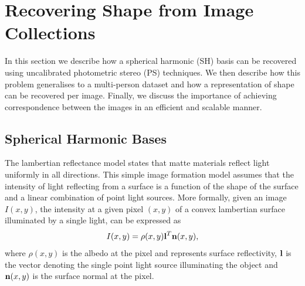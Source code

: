 \section{Recovering Shape from Image Collections}\label{sec:imag_coll_problem}
In this section we describe how a spherical harmonic (SH) basis can be recovered
using uncalibrated photometric stereo (PS) techniques. We then describe how this
problem generalises to a multi-person dataset and how a representation of shape
can be recovered per image. Finally, we discuss the importance of achieving
correspondence between the images in an efficient and scalable manner.
\subsection{Spherical Harmonic Bases}\label{subsec:imag_coll_spherical_harmonic}
The lambertian reflectance model states that matte materials reflect light
uniformly in all directions. This simple image formation model assumes that the
intensity of light reflecting from a surface is a function of the shape of the
surface and a linear combination of point light sources. More formally, given an
image $I(x, y)$, the intensity at a given pixel $(x, y)$ of a convex lambertian
surface illuminated by a single light, can be expressed as
\begin{equation}\label{eq:lambert_law}
    I(x, y) = \rho(x, y) \boldsymbol{\mathbf{l}}^T \boldsymbol{\mathbf{n}}(x, y),
\end{equation}
where $\rho(x, y)$ is the albedo at the pixel and represents surface
reflectivity, $\boldsymbol{\mathbf{l}}$ is the vector denoting the single point light source
illuminating the object and $\boldsymbol{\mathbf{n}}(x, y)$ is the surface normal at the
pixel.

